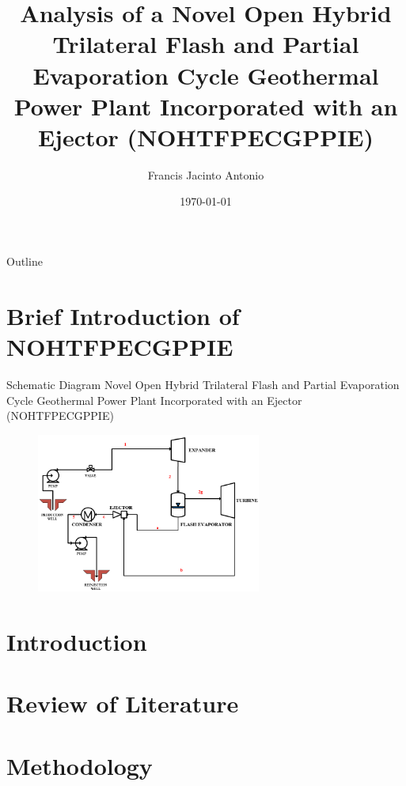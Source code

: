 \documentclass[dvipsnames, aspectratio=169]{beamer}
\title[Analysis of a NOHTFPECGPPIE]{Analysis of a Novel Open Hybrid Trilateral Flash and Partial Evaporation Cycle Geothermal Power Plant Incorporated with an Ejector (NOHTFPECGPPIE)}
\author[Francis J. Antonio]{Francis Jacinto Antonio}
\institute[UP Diliman]{Dissertation Proposal Defense}
\date{\today}
\begin{document}

\begin{frame}
	\maketitle
\end{frame}

\begin{frame}{Outline}
	\tableofcontents
\end{frame}

\section{Brief Introduction of NOHTFPECGPPIE}
\begin{frame}{\small Schematic Diagram Novel Open Hybrid Trilateral Flash and Partial Evaporation Cycle Geothermal Power Plant Incorporated with an Ejector (NOHTFPECGPPIE)}
	\begin{figure}[h]
    \centering
    \includegraphics[height=5.25cm]{images/NOHTFPECGPPIE.PNG}
    \label{fig:NOHTFPECGPPIE}
\end{figure}
\end{frame}

\section{Introduction}


\section{Review of Literature}


\section{Methodology}

\end{document}
